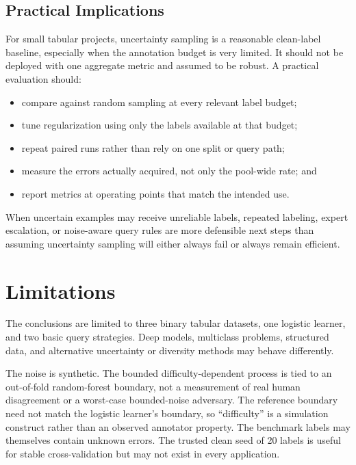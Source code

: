 \documentclass[11pt]{article}
\begin{document}
\subsection{Practical Implications}

For small tabular projects, uncertainty sampling is a reasonable clean-label
baseline, especially when the annotation budget is very limited. It should
not be deployed with one aggregate metric and assumed to be robust. A
practical evaluation should:

\begin{itemize}
  \item compare against random sampling at every relevant label budget;
  \item tune regularization using only the labels available at that budget;
  \item repeat paired runs rather than rely on one split or query path;
  \item measure the errors actually acquired, not only the pool-wide rate; and
  \item report metrics at operating points that match the intended use.
\end{itemize}

When uncertain examples may receive unreliable labels, repeated labeling,
expert escalation, or noise-aware query rules are more defensible next steps
than assuming uncertainty sampling will either always fail or always remain
efficient.

\section{Limitations}

The conclusions are limited to three binary tabular datasets, one logistic
learner, and two basic query strategies. Deep models, multiclass problems,
structured data, and alternative uncertainty or diversity methods may behave
differently.

The noise is synthetic. The bounded difficulty-dependent process is tied to
an out-of-fold random-forest boundary, not a measurement of real human
disagreement or a worst-case bounded-noise adversary. The reference boundary
need not match the logistic learner's boundary, so ``difficulty'' is a
simulation construct rather than an observed annotator property. The
benchmark labels may themselves contain unknown errors. The trusted clean
seed of 20 labels is useful for stable cross-validation but may not exist in
every application.
\end{document}
